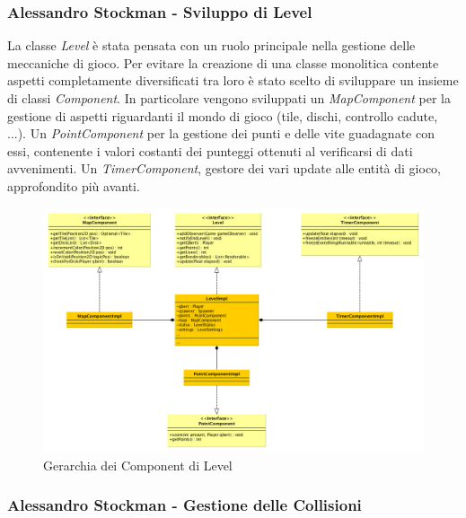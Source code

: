 \documentclass[a4paper,12pt, hidelinks]{report}
\begin{document}
\begin{flushright}
\item\subsubsection{Alessandro Stockman - Sviluppo di Level}
\end{flushright}

La classe \emph{Level} è stata pensata con un ruolo principale nella gestione delle meccaniche di gioco. Per evitare la creazione di una classe monolitica contente aspetti completamente diversificati tra loro è stato scelto di sviluppare un insieme di classi \emph{Component}.
In particolare vengono sviluppati un \emph{MapComponent} per la gestione di aspetti riguardanti il mondo di gioco (tile, dischi, controllo cadute, ...). 
Un \emph{PointComponent} per la gestione dei punti e delle vite guadagnate con essi, contenente i valori costanti dei punteggi ottenuti al verificarsi di dati avvenimenti.
Un \emph{TimerComponent}, gestore dei vari update alle entità di gioco, approfondito più avanti.

\begin{figure}[H]
\centering{}
\includegraphics[width=\linewidth]{img/LevelArchitecture}
\caption{Gerarchia dei Component di Level}
\label{img:LevelArchitecture}
\end{figure}

\begin{flushright}
\item\subsubsection{Alessandro Stockman - Gestione delle Collisioni}
\end{flushright}
\end{document}
